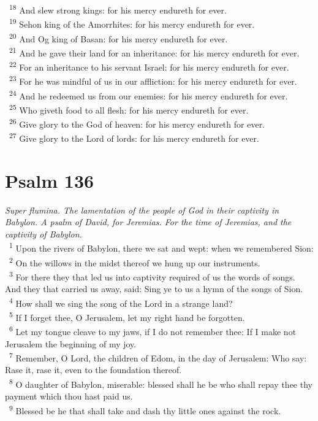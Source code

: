 \documentclass[a5paper,12pt]{article}
\begin{document}
\begin{multicols*}{2}
~\textsuperscript{18} And slew strong kings: for his mercy endureth for ever.\\
~\textsuperscript{19} Sehon king of the Amorrhites: for his mercy endureth for ever.\\
~\textsuperscript{20} And Og king of Basan: for his mercy endureth for ever.\\
~\textsuperscript{21} And he gave their land for an inheritance: for his mercy endureth for ever.\\
~\textsuperscript{22} For an inheritance to his servant Israel: for his mercy endureth for ever.\\
~\textsuperscript{23} For he was mindful of us in our affliction: for his mercy endureth for ever.\\
~\textsuperscript{24} And he redeemed us from our enemies: for his mercy endureth for ever.\\
~\textsuperscript{25} Who giveth food to all flesh: for his mercy endureth for ever.\\
~\textsuperscript{26} Give glory to the God of heaven: for his mercy endureth for ever.\\
~\textsuperscript{27} Give glory to the Lord of lords: for his mercy endureth for ever.\\

\section{Psalm 136}
\label{sec:org5b48f8e}
\emph{Super flumina. The lamentation of the people of God in their captivity in Babylon. A psalm of David, for Jeremias. For the time of Jeremias, and the captivity of Babylon.}\\

~\textsuperscript{1} Upon the rivers of Babylon, there we sat and wept: when we remembered Sion:\\
~\textsuperscript{2} On the willows in the midst thereof we hung up our instruments.\\
~\textsuperscript{3} For there they that led us into captivity required of us the words of songs. And they that carried us away, said: Sing ye to us a hymn of the songs of Sion.\\
~\textsuperscript{4} How shall we sing the song of the Lord in a strange land?\\
~\textsuperscript{5} If I forget thee, O Jerusalem, let my right hand be forgotten.\\
~\textsuperscript{6} Let my tongue cleave to my jaws, if I do not remember thee: If I make not Jerusalem the beginning of my joy.\\
~\textsuperscript{7} Remember, O Lord, the children of Edom, in the day of Jerusalem: Who say: Rase it, rase it, even to the foundation thereof.\\
~\textsuperscript{8} O daughter of Babylon, miserable: blessed shall he be who shall repay thee thy payment which thou hast paid us.\\
~\textsuperscript{9} Blessed be he that shall take and dash thy little ones against the rock.\\


\end{multicols*}
\end{document}

